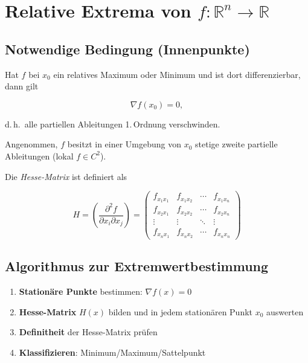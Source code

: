 \documentclass[a4paper,11pt,oneside,open=any,parskip=half, DIV=15]{scrreprt}
\begin{document}
\endgroup

\section{Relative Extrema von \texorpdfstring{\(f\colon\mathbb{R}^n\to\mathbb{R}\)}{f: Rⁿ → R}}

   \subsection*{Notwendige Bedingung (Innenpunkte)}
      Hat \(f\) bei \(x_0\) ein relatives Maximum oder Minimum und ist dort differenzierbar, dann gilt
      \begin{importantbox}
         \[
            \nabla f(x_0) = 0,
         \]
         \end{importantbox}
      d.\,h.\ alle partiellen Ableitungen 1.\,Ordnung verschwinden.

      Angenommen, \(f\) besitzt in einer Umgebung von \(x_0\) stetige zweite partielle Ableitungen (lokal \(f \in C^2\)).

      Die \emph{Hesse-Matrix} ist definiert als
      \begin{importantbox}
         \[
            H = \left( \frac{\partial^2 f}{\partial x_i \partial x_j} \right) = 
               \begin{pmatrix} 
                  f_{x_1 x_1} & f_{x_1 x_2} & \cdots & f_{x_1 x_n}\\ 
                  f_{x_2 x_1} & f_{x_2 x_2} & \cdots & f_{x_2 x_n}\\ 
                  \vdots & \vdots & \ddots & \vdots\\ 
                  f_{x_n x_1} & f_{x_n x_2} & \cdots & f_{x_n x_n}
               \end{pmatrix}
         \]
      \end{importantbox}

   \subsection*{Algorithmus zur Extremwertbestimmung}
      \begin{enumerate}
         \item \textbf{Stationäre Punkte} bestimmen: \(\nabla f(x) = 0\)
         \item \textbf{Hesse-Matrix} \(H(x)\) bilden und in jedem stationären Punkt \(x_0\) auswerten
         \item \textbf{Definitheit} der Hesse-Matrix prüfen
         \item \textbf{Klassifizieren}: Minimum/Maximum/Sattelpunkt
      \end{enumerate}
\end{document}
